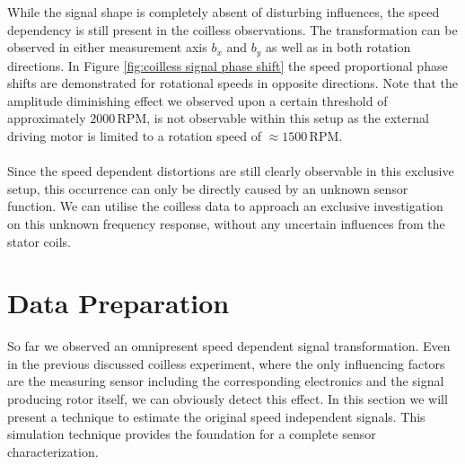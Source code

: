 \documentclass[english]{isasthesis}
\begin{document}
    	 While the signal shape is completely absent of disturbing influences, the speed dependency is still present in the coilless observations. The transformation can be observed in either measurement axis $b_x$ and $b_y$ as well as in both rotation directions. In Figure \ref{fig:coilless signal phase shift} the speed proportional phase shifts are demonstrated for rotational speeds in opposite directions. Note that the amplitude diminishing effect we observed upon a certain threshold of approximately $2000\,$RPM, is not observable within this setup as the external driving motor is limited to a rotation speed of $\approx1500\,$RPM. \\\\
    	Since the speed dependent distortions are still clearly observable in this exclusive setup, this occurrence can only be directly caused by an unknown sensor function. We can utilise the coilless data to approach an exclusive investigation on this unknown frequency response, without any uncertain influences from the stator coils.
   
    	\section{Data Preparation}\label{data preperation}
    	So far we observed an omnipresent speed dependent signal transformation. Even in the previous discussed coilless experiment, where the only influencing factors are the measuring sensor including the corresponding electronics and the signal producing rotor itself, we can obviously detect this effect. In this section we will present a technique to estimate the original speed independent signals. This simulation technique provides the foundation for a complete sensor characterization.
\end{document}
